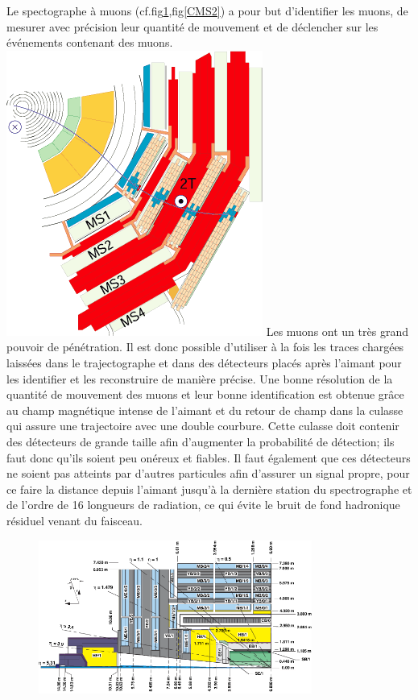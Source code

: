 Le spectographe à muons (cf.fig\ref{CMS1},fig\ref{CMS2}) a pour but d'identifier les muons, de mesurer avec précision leur quantité de mouvement et de déclencher sur les événements contenant des muons.
\marginpar
{
	\centering
	\includegraphics[width=\marginparwidth]{CMS/MUON.png}
	\label{MUON}
} Les muons ont un très grand pouvoir de pénétration. Il est donc possible d'utiliser à la fois les traces chargées laissées dans le trajectographe et dans des détecteurs placés après l'aimant pour les identifier et les reconstruire de manière précise. Une bonne résolution de la quantité de mouvement des muons et leur bonne identification est obtenue grâce au champ magnétique intense de l'aimant et du retour de champ dans la culasse qui assure une trajectoire avec une double courbure. Cette culasse doit contenir des détecteurs de grande taille afin d'augmenter la probabilité de détection; ils faut donc qu'ils soient peu onéreux et fiables. Il faut également que ces détecteurs ne soient pas atteints par d'autres particules afin d'assurer un signal propre, pour ce faire la distance depuis l'aimant jusqu'à la dernière station du spectrographe et de l'ordre de 16 longueurs de radiation, ce qui évite le bruit de fond hadronique résiduel venant du faisceau.

\begin{figure}
\centering
\includegraphics[width=0.80\textwidth]{CMS/CMSLONG.png}
\label{CMS1}
\end{figure}


